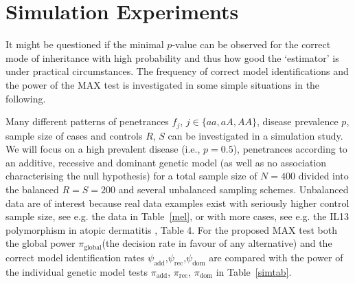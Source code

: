 \documentclass[bimj,fleqn]{w-art}
\begin{document}
\section{Simulation Experiments \label{sim}}

It might be questioned if the minimal $p$-value can be observed for the
correct mode of inheritance with high probability and thus how good the `estimator' 
is under practical circumstances. The frequency of
correct model identifications and the power of the MAX test is investigated
in some simple situations in the following.

Many different patterns of penetrances $f_j$, $j \in \{aa, aA, AA\}$, 
disease prevalence $p$, sample size of cases and controls 
$R$, $S$ can be investigated in a simulation study. We will 
focus on a high prevalent disease (i.e., $p=0.5$), penetrances according 
to an additive, recessive and dominant genetic model (as well as no 
association characterising the null hypothesis) for a total sample size 
of $N=400$ divided into the balanced $R=S=200$ and several unbalanced sampling schemes. 
Unbalanced data are of interest because real data examples exist with 
seriously higher control sample size, see e.g. the data in Table~\ref{mel}, 
or with more cases, see e.g. the IL13 polymorphism in atopic 
dermatitis \cite{Neuhauser:2002}, Table 4. For the proposed MAX test both the global 
power $\pi_\text{global}$(the decision rate in favour of any alternative) and the 
correct model identification rates $\psi_\text{add}$,$\psi_\text{rec}$,$\psi_\text{dom}$ 
are compared with the power of the individual genetic model tests 
$\pi_\text{add}$, $\pi_\text{rec}$, $\pi_\text{dom}$ in Table~\ref{simtab}.
\end{document}
